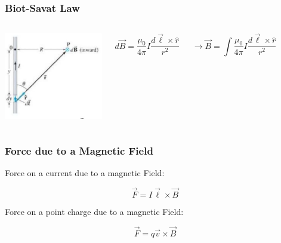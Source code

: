 \documentclass[]{beamer}
\begin{document}

\begin{frame}
\frametitle{Biot-Savat Law}


   \begin{columns}[c]
   \column{2in}  %
  
\begin{center}
  \includegraphics[height=1.5in]{images5/BS.jpg}
\end{center}

   \column{2in}
\begin{equation}
d\vec{B} =\frac{\mu_0}{4\pi}I \frac{d\vec{\ell}\times \hat{r}}{r^2}
\end{equation}

\pause
\begin{equation}
\rightarrow \vec{B} =\int\frac{\mu_0}{4\pi}I \frac{d\vec{\ell}\times \hat{r}}{r^2}
\end{equation}


   \end{columns}







  \end{frame}




\begin{frame}
\frametitle{Force due to a Magnetic Field}



Force on a current  due to a magnetic Field:
\vspace{3mm}

\pause
\begin{equation}
\vec{F}=I\vec{\ell}\times \vec{B}
\end{equation}
\pause
\vspace{3mm}

Force on a point charge  due to a magnetic Field:
\vspace{3mm}
\pause

\begin{equation}
\vec{F}=q\vec{v}\times \vec{B}
\end{equation}







  \end{frame}
\end{document}
